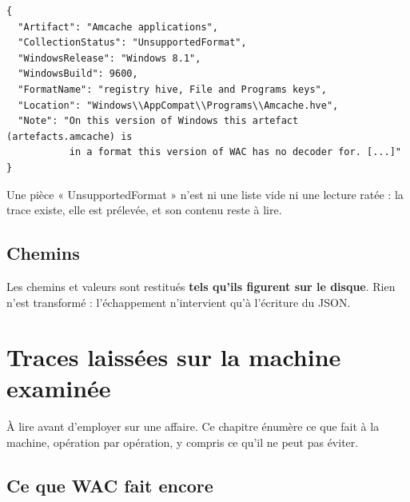 \documentclass[11pt,a4paper,oneside]{report}
\begin{document}
\begin{lstlisting}
{
  "Artifact": "Amcache applications",
  "CollectionStatus": "UnsupportedFormat",
  "WindowsRelease": "Windows 8.1",
  "WindowsBuild": 9600,
  "FormatName": "registry hive, File and Programs keys",
  "Location": "Windows\\AppCompat\\Programs\\Amcache.hve",
  "Note": "On this version of Windows this artefact (artefacts.amcache) is
           in a format this version of WAC has no decoder for. [...]"
}
\end{lstlisting}

\begin{attention}
Une pièce « UnsupportedFormat » n'est ni une liste vide ni une lecture ratée :
la trace existe, elle est prélevée, et son contenu reste à lire.
\end{attention}

\section{Chemins}

Les chemins et valeurs sont restitués \textbf{tels qu'ils figurent sur le
disque}. Rien n'est transformé : l'échappement n'intervient qu'à l'écriture du
JSON.

\chapter{Traces laissées sur la machine examinée}\label{chap:traces}

À lire avant d'employer \wac{} sur une affaire. Ce chapitre énumère ce que \wac{}
fait à la machine, opération par opération, y compris ce qu'il ne peut pas
éviter.

\section{Ce que WAC fait encore}
\end{document}

